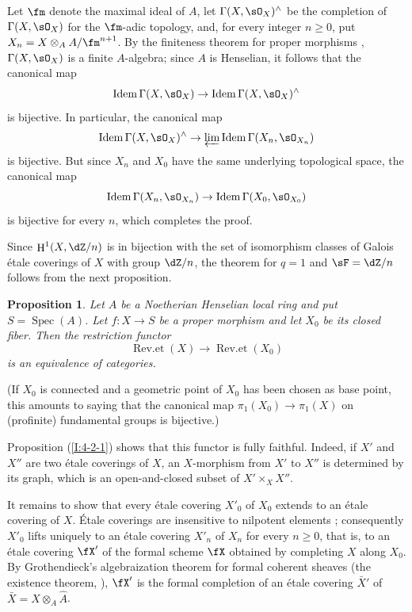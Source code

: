 \documentclass[12pt,oneside,english]{smfbook}
\DeclareMathOperator{\h}{H}
\DeclareMathOperator{\spec}{Spec}
\newtheorem{proposition}[subsubsection]{Proposition}
\begin{document}
Let $\fm$ denote the maximal ideal of $A$, let $\Gamma(X,\sO_X)^\wedge$ be the completion of $\Gamma(X,\sO_X)$ for the $\fm$-adic topology, and, for every integer $n\geqslant0$, put $X_n=X\otimes_AA/\fm^{n+1}$. By the finiteness theorem for proper morphisms \cite[III.3.2]{ega}, $\Gamma(X,\sO_X)$ is a finite $A$-algebra; since $A$ is Henselian, it follows that the canonical map
\[
  \operatorname{Idem} \Gamma(X,\sO_X) \to \operatorname{Idem}\Gamma(X,\sO_X)^\wedge
\]
is bijective. In particular, the canonical map
\[
  \operatorname{Idem} \Gamma(X,\sO_X)^\wedge \to \varprojlim \operatorname{Idem}\Gamma(X_n,\sO_{X_n})
\]
is bijective. But since $X_n$ and $X_0$ have the same underlying topological space, the canonical map
\[
  \operatorname{Idem}\Gamma(X_n,\sO_{X_n}) \to \operatorname{Idem} \Gamma(X_0,\sO_{X_0})
\]
is bijective for every $n$, which completes the proof.

Since $\h^1(X,\dZ/n)$ is in bijection with the set of isomorphism classes of Galois étale coverings of $X$ with group $\dZ/n$, the theorem for $q=1$ and $\sF=\dZ/n$ follows from the next proposition.

\begin{proposition}\label{I:4-2-2}
Let $A$ be a Noetherian Henselian local ring and put $S=\spec(A)$. Let $f:X\to S$ be a proper morphism and let $X_0$ be its closed fiber. Then the restriction functor
\[
  \operatorname{Rev.et}(X) \to \operatorname{Rev.et}(X_0)
\]
is an equivalence of categories.
\end{proposition}

(If $X_0$ is connected and a geometric point of $X_0$ has been chosen as base point, this amounts to saying that the canonical map $\pi_1(X_0)\to\pi_1(X)$ on (profinite) fundamental groups is bijective.)

Proposition (\ref{I:4-2-1}) shows that this functor is fully faithful. Indeed, if $X'$ and $X''$ are two étale coverings of $X$, an $X$-morphism from $X'$ to $X''$ is determined by its graph, which is an open-and-closed subset of $X'\times_XX''$.

It remains to show that every étale covering $X'_0$ of $X_0$ extends to an étale covering of $X$. Étale coverings are insensitive to nilpotent elements \cite[ch.1]{sga1}; consequently $X'_0$ lifts uniquely to an étale covering $X'_n$ of $X_n$ for every $n\geqslant0$, that is, to an étale covering $\fX'$ of the formal scheme $\fX$ obtained by completing $X$ along $X_0$. By Grothendieck's algebraization theorem for formal coherent sheaves (the existence theorem, \cite[III.5]{ega}), $\fX'$ is the formal completion of an étale covering $\bar X'$ of $\bar X=X\otimes_A\hat A$.
\end{document}
